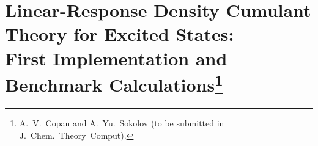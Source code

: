 \chapter[%
    Linear-Response Density Cumulant Theory for Excited States:\\
	First Implementation and Benchmark Calculations
]{%
    Linear-Response Density Cumulant Theory for Excited States:\\
	First Implementation and Benchmark Calculations\footnote{%
        A.~V.~Copan and A.~Yu.~Sokolov (to be submitted in
        J.~Chem.~Theory~Comput).
    }
}
\label{ch:response}

\lipsum
